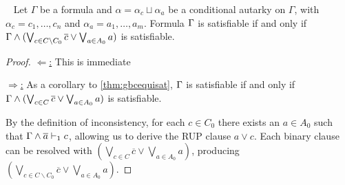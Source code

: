 


\begin{theorem}~\label{thm:shrunkgbcequisat}
    Let $\Gamma$ be a formula and $\alpha = \alpha_c \sqcup \alpha_a$ be a conditional autarky on $\Gamma$, with $\alpha_c = c_1, \dots, c_n$ and $\alpha_a = a_1, \dots, a_m$. Formula $\Gamma$ is satisfiable if and only if $\Gamma \land (\bigvee_{c \in C \backslash C_0} \overline{c} \lor \bigvee_{a \in A_0} a)$ is satisfiable.
\end{theorem}

\begin{proof}
    \underline{$\Leftarrow$:} This is immediate


    \underline{$\Rightarrow$:}  As a corollary to \autoref{thm:gbcequisat},
    $\Gamma$ is satisfiable if and only if $\Gamma \land (\bigvee_{c \in C}
    \overline{c} \lor \bigvee_{a \in A_0} a)$ is satisfiable.
    
    By the definition of inconsistency, for each $c \in C_0$ there exists an $a \in A_0$ such that $\Gamma \land \overline{a} \vdash_1 c$, 
    allowing us to derive the RUP clause  $a \lor c$. 
    Each binary clause can be resolved with $ (\bigvee_{c \in C}
    \overline{c} \lor \bigvee_{a \in A_0} a)$, producing  $(\bigvee_{c \in C \backslash C_0} \overline{c} \lor \bigvee_{a \in A_0} a)$. 
    

%
%
\end{proof}

